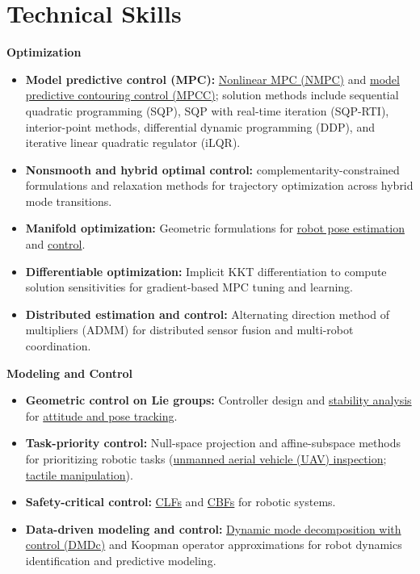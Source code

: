 \documentclass[letterpaper,11pt]{article}
\begin{document}
\section{Technical Skills}
{\small\textbf{Optimization}\par}
\begin{itemize}[leftmargin=0.22in, itemsep=2pt, parsep=0pt, topsep=4pt]
\small
\item \textbf{Model predictive control (MPC):} \href{https://arxiv.org/abs/2510.11525}{Nonlinear MPC (NMPC)} and \href{https://arxiv.org/abs/2609.36482}{model predictive contouring control (MPCC)}; solution methods include sequential quadratic programming (SQP), SQP with real-time iteration (SQP-RTI), interior-point methods, differential dynamic programming (DDP), and iterative linear quadratic regulator (iLQR).
\item \textbf{Nonsmooth and hybrid optimal control:} complementarity-constrained formulations and relaxation methods for trajectory optimization across hybrid mode transitions.
\item \textbf{Manifold optimization:} Geometric formulations for \href{https://arxiv.org/abs/2410.13541}{robot pose estimation} and \href{https://arxiv.org/abs/2510.11525}{control}.
\item \textbf{Differentiable optimization:} Implicit KKT differentiation to compute solution sensitivities for gradient-based MPC tuning and learning.
\item \textbf{Distributed estimation and control:} Alternating direction method of multipliers (ADMM) for distributed sensor fusion and multi-robot coordination.
\end{itemize}
{\small\textbf{Modeling and Control}\par}
\begin{itemize}[leftmargin=0.22in, itemsep=2pt, parsep=0pt, topsep=4pt]
\small
\item \textbf{Geometric control on Lie groups:} Controller design and \href{https://arxiv.org/abs/2504.08841}{stability analysis} for \href{https://arxiv.org/abs/2510.11525}{attitude and pose tracking}.
\item \textbf{Task-priority control:} Null-space projection and affine-subspace methods for prioritizing robotic tasks (\href{https://arxiv.org/abs/2311.08019}{unmanned aerial vehicle (UAV) inspection}; \href{https://arxiv.org/abs/2605.20392}{tactile manipulation}).
\item \textbf{Safety-critical control:} \href{https://arxiv.org/abs/2504.08841}{CLFs} and \href{https://arxiv.org/abs/2504.08841}{CBFs} for robotic systems.
\item \textbf{Data-driven modeling and control:} \href{https://www.mdpi.com/1424-8220/22/13/4712}{Dynamic mode decomposition with control (DMDc)} and Koopman operator approximations for robot dynamics identification and predictive modeling.
\end{itemize}
\newpage
\end{document}
